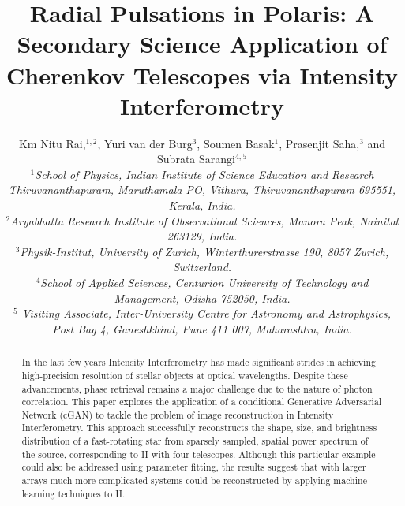 \documentclass[fleqn,usenatbib,twocolumn, 11pt]{article}
\title{Radial Pulsations in Polaris: A Secondary Science Application of Cherenkov Telescopes via Intensity Interferometry}
\date{}
\author[Rai et al.]{Km Nitu Rai,$^{1,2}$, Yuri van der Burg$^{3}$, Soumen Basak$^{1}$, Prasenjit Saha,$^{3}$ and
	Subrata Sarangi$^{4,5}$ \\ 
	
	\textit{
	$^{1}$School of Physics, Indian Institute of Science Education and Research Thiruvananthapuram, Maruthamala PO, Vithura, Thiruvananthapuram 695551, Kerala, India.} \\
	\textit{
	$^{2}$Aryabhatta Research Institute of Observational Sciences, Manora Peak, Nainital 263129, India.} \\
	\textit{
	$^{3}$Physik-Institut, University of Zurich, Winterthurerstrasse 190, 8057 Zurich, Switzerland.} \\
	\textit{
	$^{4}$School of Applied Sciences, Centurion University of Technology and Management, Odisha-752050, India.} \\
	\textit{
	$^5$ Visiting Associate, Inter-University Centre for Astronomy and Astrophysics, Post Bag 4, Ganeshkhind, Pune 411 007, Maharashtra, India.}}
\begin{document}
	\maketitle
\begin{abstract}
	In the last few years Intensity Interferometry has made significant strides in achieving high-precision resolution of stellar objects at optical wavelengths. Despite these advancements, phase retrieval remains a major challenge due to the nature of photon correlation. This paper explores the application of a conditional Generative Adversarial Network (cGAN) to tackle the problem of image reconstruction in Intensity Interferometry. This approach successfully reconstructs the shape, size, and brightness distribution of a fast-rotating star from sparsely sampled, spatial power spectrum of the source, corresponding to II with four telescopes.  Although this particular example could also be addressed using parameter fitting, the results suggest that with larger arrays much more complicated systems could be reconstructed by applying machine-learning techniques to II.
\end{abstract}









\end{document}
